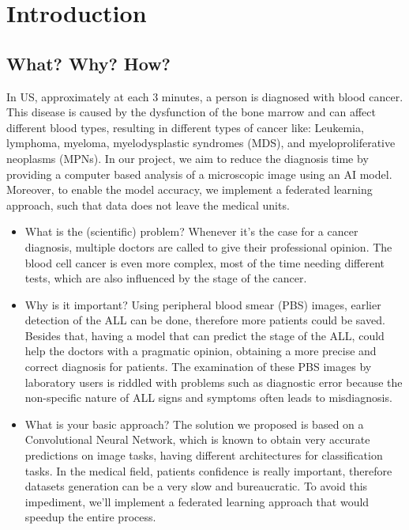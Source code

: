 \documentclass[runningheads,a4paper,11pt]{report}
\begin{document}
\tableofcontents

\newpage

\listoftables
\listoffigures

\newpage




\newpage



 


\chapter{Introduction}
\label{chapter:introduction}

\section{What? Why? How?}
\label{section:what}

In US, approximately at each 3 minutes, a person is diagnosed with blood cancer. This disease is caused by the dysfunction of the bone marrow and can affect different blood types, resulting in different types of cancer like: Leukemia, lymphoma, myeloma, myelodysplastic syndromes (MDS), and myeloproliferative neoplasms (MPNs). In our project, we aim to reduce the diagnosis time by providing a computer based analysis of a microscopic image using an AI model. Moreover, to enable the model accuracy, we implement a federated learning approach, such that data does not leave the medical units.
\begin{itemize}
	\item What is the (scientific) problem? 
 Whenever it's the case for a cancer diagnosis, multiple doctors are called to give their professional opinion. The blood cell cancer is even more complex, most of the time needing different tests, which are also influenced by the stage of the cancer.  
	\item Why is it important? 
 Using peripheral blood smear (PBS) images, earlier detection of the ALL can be done, therefore more patients could be saved. Besides that, having a model that can predict the stage of the ALL, could help the doctors with a pragmatic opinion, obtaining a more precise and correct diagnosis for patients. The examination of these PBS images by laboratory users is riddled with problems such as diagnostic error because the non-specific nature of ALL signs and symptoms often leads to misdiagnosis.
	\item What is your basic approach? 
 The solution we proposed is based on a Convolutional Neural Network, which is known to obtain very accurate predictions on image tasks, having different architectures for classification tasks. In the medical field, patients confidence is really important, therefore datasets generation can be a very slow and bureaucratic. To avoid this impediment, we'll implement a federated learning approach that would speedup the entire process.
\end{itemize}
\end{document}
